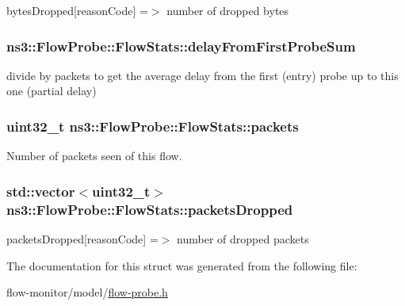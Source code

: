bytes\+Dropped\mbox{[}reason\+Code\mbox{]} =$>$ number of dropped bytes 

\subsubsection[{\texorpdfstring{delay\+From\+First\+Probe\+Sum}{delayFromFirstProbeSum}}]{ ns3\+::\+Flow\+Probe\+::\+Flow\+Stats\+::delay\+From\+First\+Probe\+Sum}\hypertarget{structns3_1_1FlowProbe_1_1FlowStats_a4c3473f9a1865006664b82d49f1fb634}{}\label{structns3_1_1FlowProbe_1_1FlowStats_a4c3473f9a1865006664b82d49f1fb634}
divide by \textquotesingle{}packets\textquotesingle{} to get the average delay from the first (entry) probe up to this one (partial delay) 
\subsubsection[{\texorpdfstring{packets}{packets}}]{\setlength{\rightskip}{0pt plus 5cm}uint32\+\_\+t ns3\+::\+Flow\+Probe\+::\+Flow\+Stats\+::packets}\hypertarget{structns3_1_1FlowProbe_1_1FlowStats_a45e424acdfef98e8c1919f362e1c2645}{}\label{structns3_1_1FlowProbe_1_1FlowStats_a45e424acdfef98e8c1919f362e1c2645}


Number of packets seen of this flow. 

\subsubsection[{\texorpdfstring{packets\+Dropped}{packetsDropped}}]{\setlength{\rightskip}{0pt plus 5cm}std\+::vector$<$uint32\+\_\+t$>$ ns3\+::\+Flow\+Probe\+::\+Flow\+Stats\+::packets\+Dropped}\hypertarget{structns3_1_1FlowProbe_1_1FlowStats_a633e71ffc04d3d8fee7f2f2d35359260}{}\label{structns3_1_1FlowProbe_1_1FlowStats_a633e71ffc04d3d8fee7f2f2d35359260}


packets\+Dropped\mbox{[}reason\+Code\mbox{]} =$>$ number of dropped packets 



The documentation for this struct was generated from the following file\+:\begin{DoxyCompactItemize}
\item 
flow-\/monitor/model/\hyperlink{flow-probe_8h}{flow-\/probe.\+h}\end{DoxyCompactItemize}
